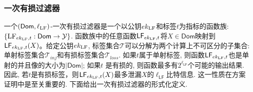 \subsubsection{一次有损过滤器}
一个$(\mathsf{Dom},\ell_{\text{LF}})$-一次有损过滤器是一个以公钥$ek_{\text{LF}}$和标签$t$为指标的函数族: $\{\text{LF}_{ek_{\text{LF}},t}:\mathsf{Dom}\rightarrow\mathcal{Y}\}$. 函数族中的任意函数$\mathsf{LF}_{ek_{\text{LF}},t}$将$X\in\mathsf{Dom}$映射到$\mathsf{LF}_{ek_{\text{LF}},t}(X)$。给定公钥$ek_{\text{LF}}$, 标签集合$\mathcal{T}$可以分解为两个计算上不可区分的子集合: 单射标签集合$\mathcal{T}_{inj}$和有损标签集合$\mathcal{T}_{loss}$. 如果$t$属于单射标签, 则函数$\mathsf{LF}_{ek_{\text{LF}},t}$也是单射的并且像的大小为$|\mathsf{Dom}|$; 如果$t$ 是有损的, 则函数最多有$2^{\ell_{\mathsf{LF}}}$个可能的输出结果. 因此, 若$t$是有损标签，则$\mathsf{LF}_{ek_{\text{LF}},t}(X)$最多泄漏$X$的$\ell_{\mathsf{LF}}$比特信息. 这一性质在方案证明中是至关重要的. 下面给出一次有损过滤器的形式化定义.
